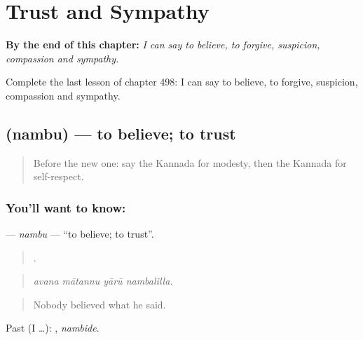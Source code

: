 
\chapter{Trust and Sympathy}
\label{ch:ka-trust-and-sympathy}

\begin{chapteropening}
\textbf{By the end of this chapter:} \emph{I can say to believe, to forgive, suspicion, compassion and sympathy.}

Complete the last lesson of chapter 498: I can say to believe, to forgive, suspicion, compassion and sympathy.
\end{chapteropening}

\section[\texorpdfstring{\kn{ನಂಬು} (nambu)}{ನಂಬು (nambu)}]{ (nambu) — to believe; to trust}

\label{lesson:KA-C498-nambu}



\begin{quote}
Before the new one: say the Kannada for modesty, then the Kannada for self-respect.
\end{quote}

\subsection*{You'll want to know: }
\textbf{} — \emph{nambu} — \textquotedblleft{}to believe; to trust\textquotedblright{}.

\begin{quote}
   .
\end{quote}

\begin{quote}
\emph{avana mātannu yārū nambalilla.}
\end{quote}

\begin{quote}
Nobody believed what he said.
\end{quote}

Past (I …): , \emph{nambide}.

